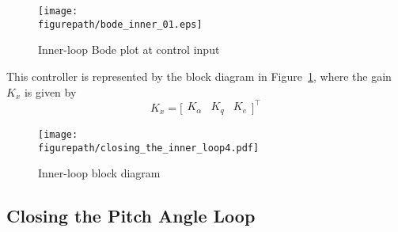 \documentclass[]{../sty/aiaa-tc}
\newcommand{\figurepath}{../fig}
\theoremstyle{examplestyle}
\begin{document}
  \begin{figure}[H]
    \begin{center}
      \texttt{[image: \\figurepath/bode\_inner\_01.eps]}
      \vspace{-0.1in}
      \caption{Inner-loop Bode plot at control input}
    \end{center}
  \end{figure}

  This controller is represented by the block diagram in Figure~\ref{fig.innerloopblock}, where the gain $K_{x}$ is given by
  \begin{equation*}
    K_{x} =
    \bigr[
    \begin{array}{ccc}
      K_{\alpha} & K_{q} & K_{e}
    \end{array}
    \bigr]^{\top}
  \end{equation*}

  \begin{figure}[H]
    \begin{center}
      \texttt{[image: \\figurepath/closing\_the\_inner\_loop4.pdf]}
      \vspace{-0.1in}
      \caption{Inner-loop block diagram\label{fig.innerloopblock}}
    \end{center}
  \end{figure}

  \subsection{Closing the Pitch Angle Loop}
\end{document}
